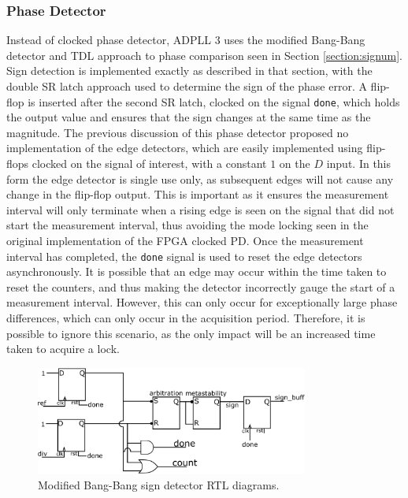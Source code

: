 \subsubsection{Phase Detector}
Instead of  clocked phase detector, \ac{ADPLL} 3 uses the modified Bang-Bang detector and \ac{TDL} approach to phase comparison seen in Section \ref{section:signum}. Sign detection is implemented exactly as described in that section, with the double \ac{SR} latch approach used to determine the sign of the phase error. A flip-flop is inserted after the second \ac{SR} latch, clocked on the signal \texttt{done}, which holds the output value and ensures that the sign changes at the same time as the magnitude. The previous discussion of this phase detector proposed no implementation of the edge detectors, which are easily implemented using flip-flops clocked on the signal of interest, with a constant $1$ on the $D$ input. In this form the edge detector is single use only, as subsequent edges will not cause any change in the flip-flop output. This is important as it ensures the measurement interval will only terminate when a rising edge is seen on the signal that did not start the measurement interval, thus avoiding the mode locking seen in the original implementation of the \ac{FPGA} clocked \ac{PD}. Once the measurement interval has completed, the \texttt{done} signal is used to reset the edge detectors asynchronously. It is possible that an edge may occur within the time taken to reset the counters, and thus making the detector incorrectly gauge the start of a measurement interval. However, this can only occur for exceptionally large phase differences, which can only occur in the acquisition period. Therefore, it is possible to ignore this scenario, as the only impact will be an increased time taken to acquire a lock.
\begin{figure}[h]
    \centering
    \includegraphics[width=0.8\textwidth]{../new_pdet1}
    \caption[Modified Bang-Bang sign detector RTL diagrams]{Modified Bang-Bang sign detector RTL diagrams.}
    \label{fig:signdet_impl}
\end{figure}

